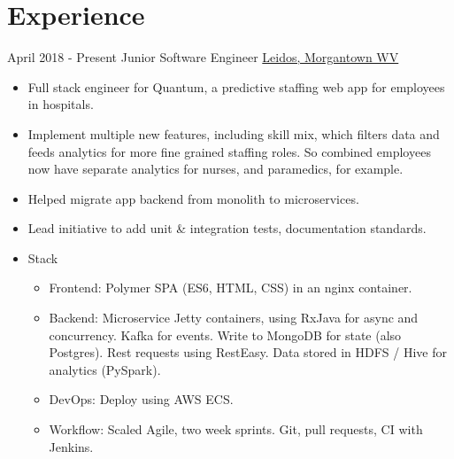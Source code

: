 \documentclass[letterpaper]{twentysecondcv} %
\begin{document}
\makeprofile %


\section{Experience}

\begin{twenty} %
\twentyitem
	{April 2018}
	{- Present}
    {Junior Software Engineer}
    {\href{https://www.leidos.com/markets/health/hospital-systems}{Leidos, Morgantown WV}}
    {}
    {\begin{itemize}
    \item Full stack engineer for Quantum, a predictive staffing web app for employees in hospitals.
    \item Implement multiple new features, including skill mix, which filters data and feeds analytics for more fine grained staffing roles.  So combined employees now have separate analytics for nurses, and paramedics, for example.
    \item Helped migrate app backend from monolith to microservices.
    \item Lead initiative to add unit \& integration tests, documentation standards.
    \item Stack
        \begin{itemize}
            \item Frontend: Polymer SPA (ES6, HTML, CSS) in an nginx container.
            \item Backend: Microservice Jetty containers, using RxJava for async and concurrency.  Kafka for events.  Write to MongoDB for state (also Postgres).   Rest requests using RestEasy.  Data stored in HDFS / Hive for analytics (PySpark).
            \item DevOps: Deploy using AWS ECS.
            \item Workflow: Scaled Agile, two week sprints.  Git, pull requests, CI with Jenkins.
        \end{itemize}
    \end{itemize}}
    \\
	

\end{twenty}
\end{document}
